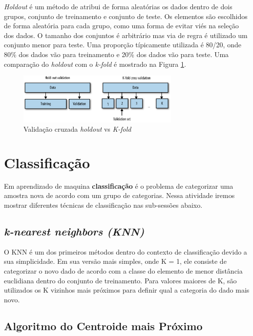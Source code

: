 \documentclass[paper=a4, fontsize=11pt]{scrartcl}
\numberwithin{equation}{section}		%
\numberwithin{figure}{section}			%
\numberwithin{table}{section}				%
\begin{document}
\textit{Holdout} é um método de atribui de forma aleatórias os dados dentro de dois grupos, conjunto de treinamento e conjunto de teste. Os elementos são escolhidos de forma aleatória para cada grupo, como uma forma de evitar viés na seleção dos dados.  O tamanho dos conjuntos é arbitrário mas via de regra é utilizado um conjunto menor para teste. Uma proporção típicamente utilizada é 80/20, onde 80\% dos dados vão para treinamento e 20\% dos dados vão para teste. Uma comparação do \textit{holdout} com o \textit{k-fold} é mostrado na Figura \ref{fig:holdout1}.

\begin{figure}[h!]
    \includegraphics[width=8cm]{img/holdout1.png}
    \centering
    \caption{Validação cruzada \textit{holdout} vs \textit{K-fold}}
    \label{fig:holdout1}
\end{figure}

\section{Classificação}

Em aprendizado de maquina \textbf{classificação} é o problema de categorizar uma amostra nova de acordo com um grupo de categorias. Nessa atividade iremos mostrar diferentes técnicas de classificação nas sub-sessões abaixo.

\subsection{\textit{k-nearest neighbors (KNN)}}

O KNN é um dos primeiros métodos dentro do contexto de classificação devido a sua simplicidade. Em sua versão mais simples, onde K = 1, ele consiste de categorizar o novo dado de acordo com a classe do elemento de menor distância euclidiana dentro do conjunto de treinamento. Para valores maiores de K, são utilizados os K vizinhos mais próximos para definir qual a categoria do dado mais novo.

\subsection{Algoritmo do Centroide mais Próximo}
\end{document}
